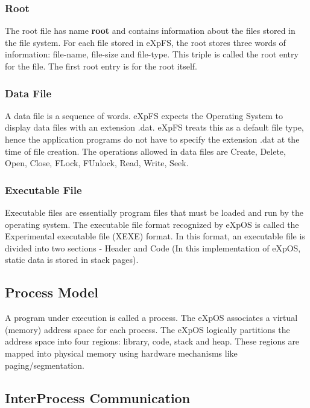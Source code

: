 \documentclass[11pt ,twosided]{article}
\begin{document}
\subsubsection{Root}

The root file has name \textbf {root} and contains information about the files stored in the file system. For each file stored in eXpFS, the root stores three words of information: file-name, file-size and file-type. This triple is called the root entry for the file. The first root entry is for the root itself.  
\subsubsection{Data File}

A data file is a sequence of words. eXpFS expects the Operating System to display data files with an extension .dat.   eXpFS treats this as a default file type, hence the application programs do not have to specify the extension .dat at the time of file creation.  
The operations allowed in data files are Create, Delete, Open, Close, FLock, FUnlock, Read, Write, Seek.
\subsubsection{Executable File}

Executable files are essentially program files that must be loaded and run by the operating system. The executable file format recognized by eXpOS is called the Experimental executable file (XEXE) format. In this format, an executable file is divided into two sections - Header and Code (In this implementation of eXpOS, static data is stored in stack pages).
\subsection{Process Model}

A program under execution is called a process. The eXpOS associates a virtual (memory) address space for each process. The eXpOS logically partitions the address space into four regions: library, code, stack and heap. These regions are mapped into physical memory using hardware mechanisms like paging/segmentation.
\subsection{Inter\-Process Communication}
\end{document}
